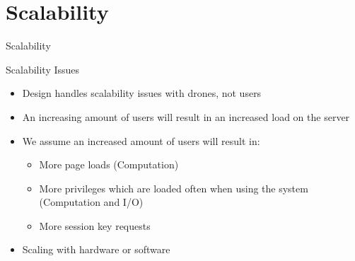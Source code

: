 \author{Esben Pilgaard M\o{}ller}

\section{Scalability}
\begin{frame}{Scalability}{}
\begin{block}{Scalability Issues}
  \begin{itemize}
  	\item Design handles scalability issues with drones, not users
    \item An increasing amount of users will result in an increased load on the server
    \item We assume an increased amount of users will result in:
    \begin{itemize}
			\item More page loads (Computation)
			\item More privileges which are loaded often when using the system (Computation and I/O)
			\item More session key requests
		\end{itemize}
		\item Scaling with hardware or software
  \end{itemize}
\end{block}
\end{frame}

